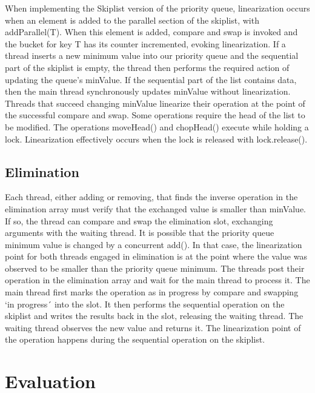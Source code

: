 \documentclass[10pt]{asme2ej}
\begin{document}
When implementing the Skiplist version of the priority queue, linearization occurs when an element is added to the parallel section of the skiplist, with addParallel(T). When this element is added, compare and swap is invoked and the bucket for key T has its counter incremented, evoking linearization. If a thread inserts a new minimum value into our priority queue and the sequential part of the skiplist is empty, the thread then performs the required action of updating the queue’s minValue. If the sequential part of the list contains data, then the main thread synchronously updates minValue without linearization. Threads that succeed changing minValue linearize their operation at the point of the successful compare and swap. Some operations require the head of the list to be modified. The operations moveHead() and chopHead() execute while holding a lock. Linearization effectively occurs when the lock is released with lock.release().

\subsection{Elimination}

Each thread, either adding or removing, that finds the inverse operation in the elimination array must verify that the exchanged value is smaller than minValue. If so, the thread can compare and swap the elimination slot, exchanging arguments with the waiting thread. It is possible that the priority queue minimum value is changed by a concurrent add(). In that case, the linearization point for both threads engaged in elimination is at the point where the value was observed to be smaller than the priority queue minimum. The threads post their operation in the elimination array and wait for the main thread to process it. The main thread first marks the operation as in progress by compare and swapping ‘in progress´ into the slot. It then performs the sequential operation on the skiplist and writes the results back in the slot, releasing the waiting thread. The waiting thread observes the new value and returns it. The linearization point of the operation happens during the sequential operation on the skiplist.


\section{Evaluation}
\end{document}
